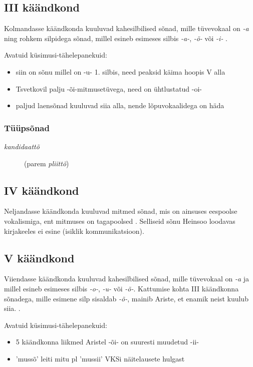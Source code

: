 \documentclass[12pt,a4paper]{article}
\newcommand{\vadja}[1]{\textit{#1}}
\begin{document}
\subsection{\RN{3} käändkond}

Kolmandasse käändkonda kuuluvad kahesilbilised sõnad, mille tüvevokaal on \vadja{-a} ning rohkem silpidega sõnad, millel esineb esimeses silbis \vadja{-a-}, \vadja{-õ-} või \vadja{-i-} \cite[42]{ariste_grammar_1968}.

Avatuid küsimusi-tähelepanekuid:
\begin{itemize}
\item siin on sõnu millel on -u- 1. silbis, need peaksid käima hoopis \RN{5} alla
\item Tsvetkovil palju -õi-mitmusetüvega, need on ühtlustatud -oi-
\item paljud laensõnad kuuluvad siia alla, nende lõpuvokaalidega on häda
\end{itemize}

\subsubsection*{Tüüpsõnad}
\begin{description}
\item [\textit{kandidaattõ}] (parem \textit{pliittõ})
\end{description}


\subsection{\RN{4} käändkond}

Neljandasse käändkonda kuuluvad mitmed sõnad, mis on ainsuses eespoolse vokalismiga, ent mitmuses on tagapoolsed \cite[43]{ariste_grammar_1968}. Selliseid sõnu Heinsoo loodavas kirjakeeles ei esine (isiklik kommunikatsioon). %


\subsection{\RN{5} käändkond}

Viiendasse käändkonda kuuluvad kahesilbilised sõnad, mille tüvevokaal on \vadja{-a} ja millel esineb esimeses silbis \vadja{-o-}, \vadja{-u-} või \vadja{-õ-}. Kattumise kohta \RN{3} käändkonna sõnadega, mille esimene silp sisaldab \vadja{-õ-}, mainib Ariste, et enamik neist kuulub siia. \cite[44]{ariste_grammar_1968}.

Avatuid küsimusi-tähelepanekuid:
\begin{itemize}
\item 5 käändkonna liikmed Aristel -õi- on suuresti muudetud -ii-
\item 'mussõ' leiti mitu pl 'mussii' VKSi näitelausete hulgast
\end{itemize}
\end{document}
